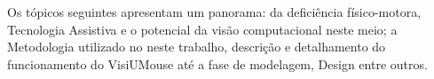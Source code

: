 Os tópicos seguintes apresentam um panorama: da deficiência físico-motora, Tecnologia Assistiva e o potencial da visão computacional neste meio; a Metodologia utilizado no neste trabalho, descrição e detalhamento do funcionamento do VisiUMouse até a fase de modelagem, Design entre outros.

